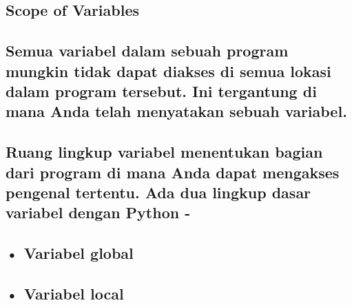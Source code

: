 \documentclass[a4paper,12pt]{report}
\begin{document}
\subsection*{Scope of Variables}
 \par
\subsection*{Semua variabel dalam sebuah program mungkin tidak dapat diakses di semua lokasi dalam program tersebut. Ini tergantung di mana Anda telah menyatakan sebuah variabel.}
 \par
\subsection*{Ruang lingkup variabel menentukan bagian dari program di mana Anda dapat mengakses pengenal tertentu. Ada dua lingkup dasar variabel dengan Python -}
 \par
\subsection*{ \hspace{10pt} • Variabel global}
 \par
\subsection*{ \hspace{10pt} • Variabel local}
 \par
\vspace{12pt}
\end{document}
